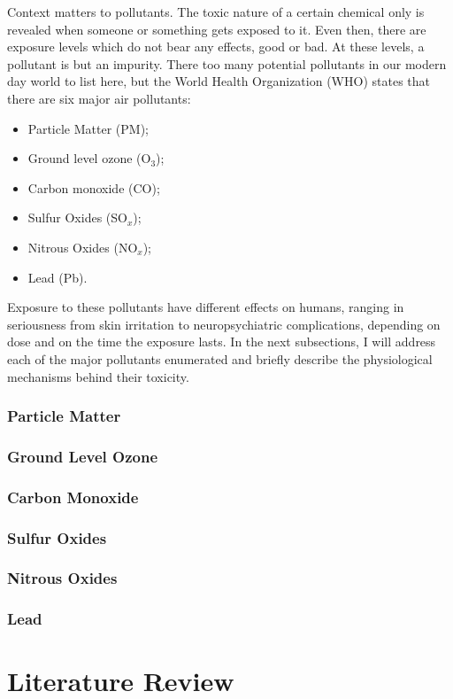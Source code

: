 Context matters to pollutants. The toxic nature of a certain chemical
only is revealed when someone or something gets exposed to it. Even
then, there are exposure levels which do not bear any effects, good or
bad. At these levels, a pollutant is but an impurity. There too many
potential pollutants in our modern day world to list here, but the World
Health Organization (\gls{WHO}) states that there are six major air
pollutants:
\begin{itemize}
    \item Particle Matter (\gls{PM});
    \item Ground level ozone (O$_3$);
    \item Carbon monoxide (CO);
    \item Sulfur Oxides (SO$_x$);
    \item Nitrous Oxides (NO$_x$);
    \item Lead (Pb).
\end{itemize}

Exposure to these pollutants have different effects on humans, ranging in
seriousness from skin irritation to neuropsychiatric complications,
depending on dose and on the time the exposure lasts. In the next
subsections, I will address each of the major pollutants enumerated and
briefly describe the physiological mechanisms behind their toxicity.

\subsubsection{Particle Matter}%
\label{ssub:particle_matter}

\subsubsection{Ground Level Ozone}%
\label{ssub:ground_level_ozone}

\subsubsection{Carbon Monoxide}%
\label{ssub:carbon_monoxide}

\subsubsection{Sulfur Oxides}%
\label{ssub:sulfur_oxides}

\subsubsection{Nitrous Oxides}%
\label{ssub:nitrous_oxides}

\subsubsection{Lead}%
\label{ssub:lead}
















\section{Literature Review}%
\label{sec:literature_review}
